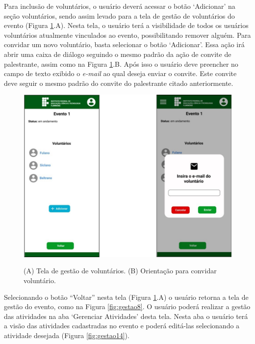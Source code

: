 Para inclusão de voluntários, o usuário deverá acessar o botão ‘Adicionar’ na seção voluntários, sendo assim levado para a tela de gestão de voluntários do evento (Figura \ref{fig:gestao12}.A). Nesta tela, o usuário terá a visibilidade de todos os usuários voluntários atualmente vinculados ao evento, possibilitando remover alguém. Para convidar um novo voluntário, basta selecionar o botão ‘Adicionar’. Essa ação irá abrir uma caixa de diálogo seguindo o mesmo padrão da ação de convite de palestrante, assim como na Figura \ref{fig:gestao12}.B. Após isso o usuário deve preencher no campo de texto exibido o \textit{e-mail} ao qual deseja enviar o convite. Este convite deve seguir o mesmo padrão do convite do palestrante citado anteriormente.

\begin{figure}[H]
    \centering
    \caption{(A) Tela de gestão de voluntários. (B) Orientação para convidar voluntário.}
    \includegraphics[scale=0.63]{figuras/Gestao/12-13.jpg}
    \label{fig:gestao12}
\end{figure}

	
Selecionando o botão “Voltar” nesta tela (Figura \ref{fig:gestao12}.A) o usuário retorna a tela de gestão do evento, como na Figura \ref{fig:gestao8}. O usuário poderá realizar a gestão das atividades na aba ‘Gerenciar Atividades’ desta tela. Nesta aba o usuário terá a visão das atividades cadastradas no evento e poderá editá-las selecionando a atividade desejada (Figura \ref{fig:gestao14}).

